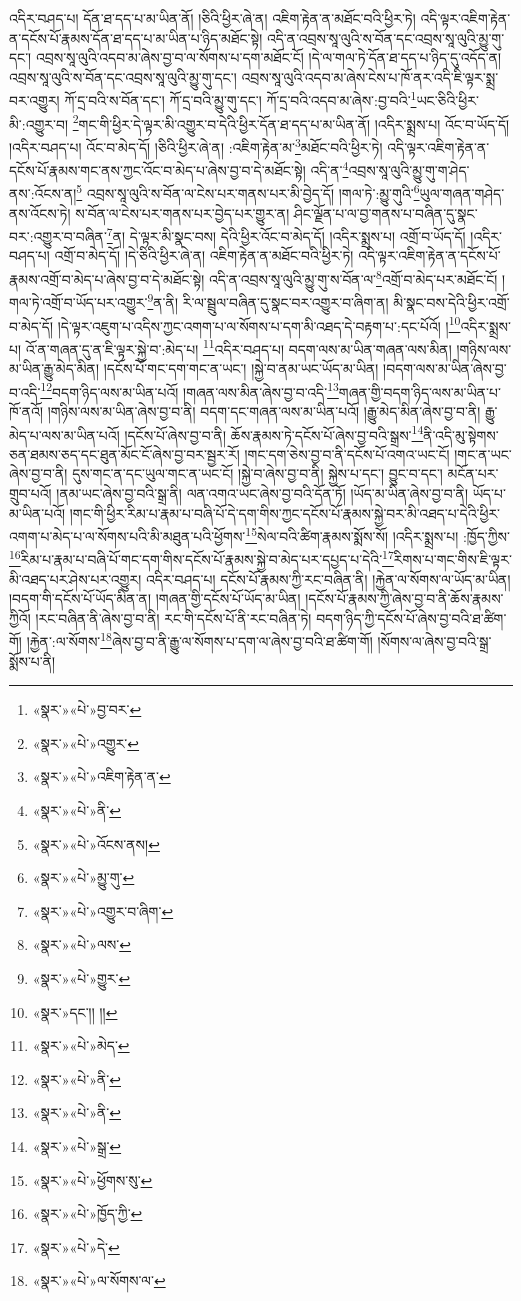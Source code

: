 འདིར་བཤད་པ། དོན་ཐ་དད་པ་མ་ཡིན་ནོ། །ཅིའི་ཕྱིར་ཞེ་ན། འཇིག་རྟེན་ན་མཐོང་བའི་ཕྱིར་ཏེ། འདི་ལྟར་འཇིག་རྟེན་ན་དངོས་པོ་རྣམས་དོན་ཐ་དད་པ་མ་ཡིན་པ་ཉིད་མཐོང་སྟེ། འདི་ན་འབྲས་སཱ་ལུའི་ས་བོན་དང་འབྲས་སཱ་ལུའི་མྱུ་གུ་དང་། འབྲས་སཱ་ལུའི་འདབ་མ་ཞེས་བྱ་བ་ལ་སོགས་པ་དག་མཐོང་ངོ། །དེ་ལ་གལ་ཏེ་དོན་ཐ་དད་པ་ཉིད་དུ་འདོད་ན། འབྲས་སཱ་ལུའི་ས་བོན་དང་འབྲས་སཱ་ལུའི་མྱུ་གུ་དང་། འབྲས་སཱ་ལུའི་འདབ་མ་ཞེས་ངེས་པ་ཁོ་ནར་འདི་ཇི་ལྟར་སྨྲ་བར་འགྱུར། ཀོ་དྲ་བའི་ས་བོན་དང་། ཀོ་དྲ་བའི་མྱུ་གུ་དང་། ཀོ་དྲ་བའི་འདབ་མ་ཞེས་:བྱ་བའི་\footnote{«སྣར་»«པེ་»བྱ་བར་}ཡང་ཅིའི་ཕྱིར་མི་:འགྱུར་བ། \footnote{«སྣར་»«པེ་»འགྱུར་}གང་གི་ཕྱིར་དེ་ལྟར་མི་འགྱུར་བ་དེའི་ཕྱིར་དོན་ཐ་དད་པ་མ་ཡིན་ནོ། །འདིར་སྨྲས་པ། འོང་བ་ཡོད་དོ། །འདིར་བཤད་པ། འོང་བ་མེད་དོ། །ཅིའི་ཕྱིར་ཞེ་ན། :འཇིག་རྟེན་མ་\footnote{«སྣར་»«པེ་»འཇིག་རྟེན་ན་}མཐོང་བའི་ཕྱིར་ཏེ། འདི་ལྟར་འཇིག་རྟེན་ན་དངོས་པོ་རྣམས་གང་ནས་ཀྱང་འོང་བ་མེད་པ་ཞེས་བྱ་བ་དེ་མཐོང་སྟེ། འདི་ན་\footnote{«སྣར་»«པེ་»ནི་}འབྲས་སཱ་ལུའི་མྱུ་གུ་ག་ཤེད་ནས་:འོངས་ན།\footnote{«སྣར་»«པེ་»འོངས་ནས།} འབྲས་སཱ་ལུའི་ས་བོན་ལ་ངེས་པར་གནས་པར་མི་བྱེད་དོ། །གལ་ཏེ་:མྱུ་གུའི་\footnote{«སྣར་»«པེ་»མྱུ་གུ་}ཡུལ་གཞན་གཤེད་ནས་འོངས་ཏེ། ས་བོན་ལ་ངེས་པར་གནས་པར་བྱེད་པར་གྱུར་ན། ཤིང་ལྗོན་པ་ལ་བྱ་གནས་པ་བཞིན་དུ་སྣང་བར་:འགྱུར་བ་བཞིན་\footnote{«སྣར་»«པེ་»འགྱུར་བ་ཞིག་}ན། དེ་ལྟར་མི་སྣང་བས། དེའི་ཕྱིར་འོང་བ་མེད་དོ། །འདིར་སྨྲས་པ། འགྲོ་བ་ཡོད་དོ། །འདིར་བཤད་པ། འགྲོ་བ་མེད་དོ། །དེ་ཅིའི་ཕྱིར་ཞེ་ན། འཇིག་རྟེན་ན་མཐོང་བའི་ཕྱིར་ཏེ། འདི་ལྟར་འཇིག་རྟེན་ན་དངོས་པོ་རྣམས་འགྲོ་བ་མེད་པ་ཞེས་བྱ་བ་དེ་མཐོང་སྟེ། འདི་ན་འབྲས་སཱ་ལུའི་མྱུ་གུ་ས་བོན་ལ་\footnote{«སྣར་»«པེ་»ལས་}འགྲོ་བ་མེད་པར་མཐོང་ངོ། །གལ་ཏེ་འགྲོ་བ་ཡོད་པར་འགྱུར་\footnote{«སྣར་»«པེ་»གྱུར་}ན་ནི། རི་ལ་སྦྲུལ་བཞིན་དུ་སྣང་བར་འགྱུར་བ་ཞིག་ན། མི་སྣང་བས་དེའི་ཕྱིར་འགྲོ་བ་མེད་དོ། །དེ་ལྟར་འཇུག་པ་འདིས་ཀྱང་འགག་པ་ལ་སོགས་པ་དག་མི་འཐད་དེ་བརྟག་པ་:དང་པོའོ། །\footnote{«སྣར་»དང་།། །།}འདིར་སྨྲས་པ། འོ་ན་གཞན་དུ་ན་ཇི་ལྟར་སྐྱེ་བ་:མེད་པ། \footnote{«སྣར་»«པེ་»མེད་}འདིར་བཤད་པ། བདག་ལས་མ་ཡིན་གཞན་ལས་མིན། །གཉིས་ལས་མ་ཡིན་རྒྱུ་མེད་མིན། །དངོས་པོ་གང་དག་གང་ན་ཡང་། །སྐྱེ་བ་ནམ་ཡང་ཡོད་མ་ཡིན། །བདག་ལས་མ་ཡིན་ཞེས་བྱ་བ་འདི་\footnote{«སྣར་»«པེ་»ནི་}བདག་ཉིད་ལས་མ་ཡིན་པའོ། །གཞན་ལས་མིན་ཞེས་བྱ་བ་འདི་\footnote{«སྣར་»«པེ་»ནི་}གཞན་གྱི་བདག་ཉིད་ལས་མ་ཡིན་པ་ཁོ་ནའོ། །གཉིས་ལས་མ་ཡིན་ཞེས་བྱ་བ་ནི། བདག་དང་གཞན་ལས་མ་ཡིན་པའོ། །རྒྱུ་མེད་མིན་ཞེས་བྱ་བ་ནི། རྒྱུ་མེད་པ་ལས་མ་ཡིན་པའོ། །དངོས་པོ་ཞེས་བྱ་བ་ནི། ཆོས་རྣམས་ཏེ་དངོས་པོ་ཞེས་བྱ་བའི་སྒྲས་\footnote{«སྣར་»«པེ་»སྒྲ་}ནི་འདི་མུ་སྟེགས་ཅན་ཐམས་ཅད་དང་ཐུན་མོང་ངོ་ཞེས་བྱ་བར་སྦྱར་རོ། །གང་དག་ཅེས་བྱ་བ་ནི་དངོས་པོ་འགའ་ཡང་ངོ། །གང་ན་ཡང་ཞེས་བྱ་བ་ནི། དུས་གང་ན་དང་ཡུལ་གང་ན་ཡང་ངོ། །སྐྱེ་བ་ཞེས་བྱ་བ་ནི། སྐྱེས་པ་དང་། བྱུང་བ་དང་། མངོན་པར་གྲུབ་པའོ། །ནམ་ཡང་ཞེས་བྱ་བའི་སྒྲ་ནི། ལན་འགའ་ཡང་ཞེས་བྱ་བའི་དོན་ཏོ། །ཡོད་མ་ཡིན་ཞེས་བྱ་བ་ནི། ཡོད་པ་མ་ཡིན་པའོ། །གང་གི་ཕྱིར་རིམ་པ་རྣམ་པ་བཞི་པོ་དེ་དག་གིས་ཀྱང་དངོས་པོ་རྣམས་སྐྱེ་བར་མི་འཐད་པ་དེའི་ཕྱིར་འགག་པ་མེད་པ་ལ་སོགས་པའི་མི་མཐུན་པའི་ཕྱོགས་\footnote{«སྣར་»«པེ་»ཕྱོགས་སུ་}སེལ་བའི་ཚིག་རྣམས་སྨོས་སོ། །འདིར་སྨྲས་པ། :ཁྱོད་ཀྱིས་\footnote{«སྣར་»«པེ་»ཁྱོད་ཀྱི་}རིམ་པ་རྣམ་པ་བཞི་པོ་གང་དག་གིས་དངོས་པོ་རྣམས་སྐྱེ་བ་མེད་པར་དཔྱད་པ་དེའི་\footnote{«སྣར་»«པེ་»དེ་}རིགས་པ་གང་གིས་ཇི་ལྟར་མི་འཐད་པར་ཤེས་པར་འགྱུར། འདིར་བཤད་པ། དངོས་པོ་རྣམས་ཀྱི་རང་བཞིན་ནི། །རྐྱེན་ལ་སོགས་ལ་ཡོད་མ་ཡིན། །བདག་གི་དངོས་པོ་ཡོད་མིན་ན། །གཞན་གྱི་དངོས་པོ་ཡོད་མ་ཡིན། །དངོས་པོ་རྣམས་ཀྱི་ཞེས་བྱ་བ་ནི་ཆོས་རྣམས་ཀྱིའོ། །རང་བཞིན་ནི་ཞེས་བྱ་བ་ནི། རང་གི་དངོས་པོ་ནི་རང་བཞིན་ཏེ། བདག་ཉིད་ཀྱི་དངོས་པོ་ཞེས་བྱ་བའི་ཐ་ཚིག་གོ། །རྐྱེན་:ལ་སོགས་\footnote{«སྣར་»«པེ་»ལ་སོགས་ལ་}ཞེས་བྱ་བ་ནི་རྒྱུ་ལ་སོགས་པ་དག་ལ་ཞེས་བྱ་བའི་ཐ་ཚིག་གོ། །སོགས་ལ་ཞེས་བྱ་བའི་སྒྲ་སྨོས་པ་ནི། 